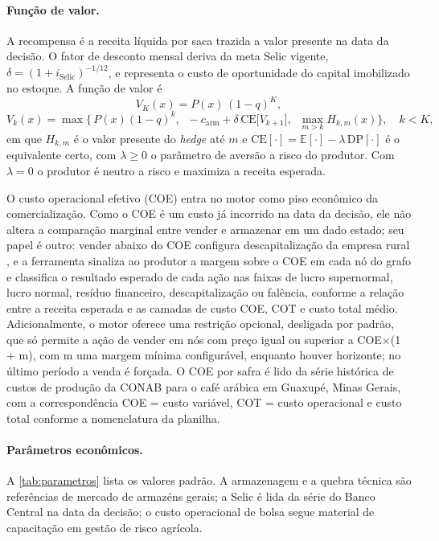 \paragraph{Função de valor.} A recompensa é a receita líquida por saca trazida a valor presente na data da decisão. O fator de desconto mensal deriva da meta Selic vigente, $\delta = (1 + i_{\text{Selic}})^{-1/12}$, e representa o custo de oportunidade do capital imobilizado no estoque. A função de valor é
\begin{equation}
	V_K(x) = P(x)\,(1-q)^K,
\end{equation}
\begin{equation}
	V_k(x) = \max\Big\{\, P(x)(1-q)^k,\;\; -c_{\text{arm}} + \delta\,\mathrm{CE}\big[V_{k+1}\big],\;\; \max_{m > k} H_{k,m}(x) \Big\}, \quad k < K,
	\label{eq:bellman}
\end{equation}
em que $H_{k,m}$ é o valor presente do \textit{hedge} até $m$ e $\mathrm{CE}[\cdot] = \mathbb{E}[\cdot] - \lambda\,\mathrm{DP}[\cdot]$ é o equivalente certo, com $\lambda \geq 0$ o parâmetro de aversão a risco do produtor. Com $\lambda = 0$ o produtor é neutro a risco e maximiza a receita esperada.

O custo operacional efetivo (COE) entra no motor como piso econômico da comercialização. Como o COE é um custo já incorrido na data da decisão, ele não altera a comparação marginal entre vender e armazenar em um dado estado; seu papel é outro: vender abaixo do COE configura descapitalização da empresa rural \cite{AgroSafety2026}, e a ferramenta sinaliza ao produtor a margem sobre o COE em cada nó do grafo e classifica o resultado esperado de cada ação nas faixas de lucro supernormal, lucro normal, resíduo financeiro, descapitalização ou falência, conforme a relação entre a receita esperada e as camadas de custo COE, COT e custo total médio. Adicionalmente, o motor oferece uma restrição opcional, desligada por padrão, que só permite a ação de vender em nós com preço igual ou superior a COE$\times$(1 + m), com m uma margem mínima configurável, enquanto houver horizonte; no último período a venda é forçada. O COE por safra é lido da série histórica de custos de produção da CONAB para o café arábica em Guaxupé, Minas Gerais, com a correspondência COE = custo variável, COT = custo operacional e custo total conforme a nomenclatura da planilha.

\paragraph{Parâmetros econômicos.} A \autoref{tab:parametros} lista os valores padrão. A armazenagem e a quebra técnica são referências de mercado de armazéns gerais; a Selic é lida da série do Banco Central na data da decisão; o custo operacional de bolsa segue material de capacitação em gestão de risco agrícola.

